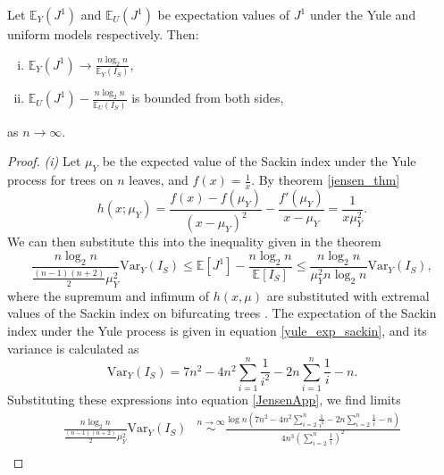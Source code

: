 \begin{proposition}\label{jensen_prop}
    Let $\mathbb{E}_Y(J^1)$ and $\mathbb{E}_U(J^1)$ be expectation values of
    $J^1$ under the Yule and uniform models respectively. Then:
    \begin{enumerate}[(i)]
        \item $\mathbb{E}_Y(J^1)\to\frac{n\log_2n}{\mathbb{E}_Y(I_S)}$,
        \item $\mathbb{E}_U(J^1)-\frac{n\log_2n}{\mathbb{E}_U(I_S)}$ is bounded
            from both sides,
    \end{enumerate}
    as $n\to\infty$.
\end{proposition}
\begin{proof}
    \textit{(i)} Let $\mu_Y$ be the expected value of the Sackin index under the
    Yule process for trees on $n$ leaves, and $f(x)=\frac{1}{x}$. By theorem
    \ref{jensen_thm}
    \begin{equation}\label{hxmuY}
        h(x;\mu_Y) = \frac{f(x)-f(\mu_Y)}{(x-\mu_Y)^2} - \frac{f'(\mu_Y)}
        {x-\mu_Y} = \frac{1}{x\mu_Y^2}.
    \end{equation}
    We can then substitute this into the inequality given in the theorem
    \begin{equation}\label{JensenApp}
        \frac{n\log_2n}{\frac{(n-1)(n+2)}{2}\mu_Y^2} \text{Var}_Y(I_S) \leq
        \mathbb{E}[J^1] - \frac{n\log_2n}{\mathbb{E}[I_S]} \leq \frac{n\log_2n}
        {\mu_Y^2n\log_2n}\text{Var}_Y(I_S),
    \end{equation}
    where the supremum and infimum of $h(x,\mu)$ are substituted with extremal
    values of the Sackin index on bifurcating trees
    \citep{fischer_extremal_2021}. The expectation of the Sackin index under the
    Yule process is given in equation \eqref{yule_exp_sackin}, and its variance
    is calculated as \citep{cardona_exact_2012}
    \begin{equation}\label{yulevarIS}
        \text{Var}_Y(I_S) = 7n^2 - 4n^2\sum_{i=1}^n\frac{1}{i^2} - 2n
        \sum_{i=1}^{n}\frac{1}{i} - n.
    \end{equation}
    Substituting these expressions into equation \eqref{JensenApp}, we find
    limits
    \begin{align*}
        \frac{n\log_2n}{\frac{(n-1)(n+2)}{2}\mu_Y^2} \text{Var}_Y(I_S) &
        \stackrel{n\to\infty}{\sim} \frac{\log n\left(7n^2 - 4n^2\sum_{i=2}^n
        \frac{1}{i^2}-2n\sum_{i=2}^n\frac{1}{i}-n\right)}{4n^3\left(\sum_{i=2}^n
        \frac{1}{i}\right)^2} \\

\end{align*}
\end{proof}

